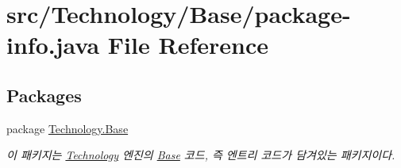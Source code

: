\hypertarget{_technology_2_base_2package-info_8java}{\section{src/\-Technology/\-Base/package-\/info.java File Reference}
\label{_technology_2_base_2package-info_8java}
}
\subsection*{Packages}
\begin{DoxyCompactItemize}
\item 
package \hyperlink{namespace_technology_1_1_base}{Technology.\-Base}
\begin{DoxyCompactList}\small\item\em 이 패키지는 \hyperlink{namespace_technology}{Technology} 엔진의 \hyperlink{namespace_technology_1_1_base}{Base} 코드, 즉 엔트리 코드가 담겨있는 패키지이다. \end{DoxyCompactList}\end{DoxyCompactItemize}

